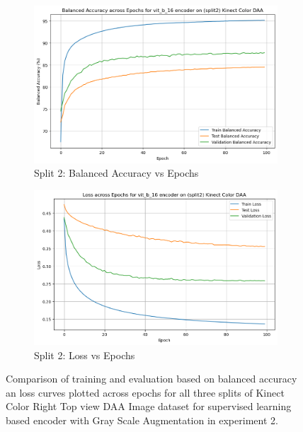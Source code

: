 \begin{figure}[htbp]
    \begin{subfigure}[b]{0.45\textwidth}
        \includegraphics[width=\textwidth]{Images_Thesis/Tensboard_runs_images_all/Experiment_01_Sup_D_A_with_Aug/Split_2/output_bal_acc_split_2_with_aug_d_a.png}
        \caption{Split 2: Balanced Accuracy vs Epochs}
        \label{fig:Exp_2_05}
    \end{subfigure}
    \hfill
    \begin{subfigure}[b]{0.45\textwidth}
        \includegraphics[width=\textwidth]{Images_Thesis/Tensboard_runs_images_all/Experiment_01_Sup_D_A_with_Aug/Split_2/output_loss_split_2_with_aug_d_a.png}
        \caption{Split 2: Loss vs Epochs}
        \label{fig:Exp_2_06}
    \end{subfigure}
    \caption[Results of Experiment 2: Supervised Learning Based Encoder with Gray Scale Augmentation]{Comparison of training and evaluation based on balanced accuracy an loss curves plotted across epochs for all three splits of Kinect Color Right Top view DAA Image dataset for supervised learning based encoder  with Gray Scale Augmentation in experiment 2.}
    \label{fig:Exp_2_00}
\end{figure}

